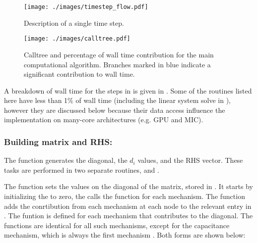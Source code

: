 \begin{figure}[htp!]
\centering
\texttt{[image: ./images/timestep\_flow.pdf]}
\caption{Description of a single time step.}
\label{fig:timestepDiagram}
\end{figure}

\begin{figure}[htp!]
\centering
\texttt{[image: ./images/calltree.pdf]}
\caption{Calltree and percentage of wall time contribution for the main computational algorithm. Branches marked in blue indicate a significant contribution to wall time.}
\label{fig:calltree}
\end{figure}

A breakdown of wall time for the steps in  is given in . Some of the routines listed here have less than 1\% of wall time (including the linear system solve in ), however they are discussed below because their data access influence the implementation on many-core architectures (e.g. GPU and MIC).
\subsubsection{Building matrix and RHS: }
\label{sec:matrix_rhs}
The function  generates the diagonal, the $d_i$ values, and the RHS vector. These tasks are performed in two separate routines,  and .

The  function sets the values on the diagonal of the matrix, stored in . It starts by initializing the  to zero, the calls the  function for each mechanism. The  function adds the conrtibution from each mechanism at each node to the relevant entry in .
The  funtion is defined for each mechanism that contributes to the diagonal.
The  functions are identical for all such mechanisms, except for the capacitance mechanism, which is always the first mechanism .
Both forms are shown below:

